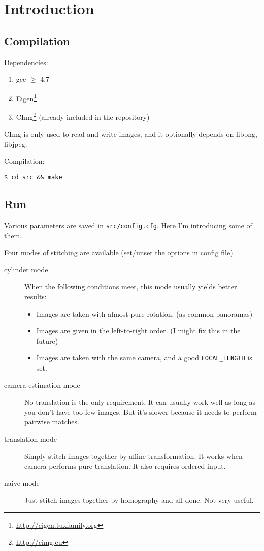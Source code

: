 \section{Introduction}
\subsection{Compilation}
Dependencies:

\begin{enumerate}
    \item gcc $ \ge$ 4.7
    \item Eigen\footnote{\url{http://eigen.tuxfamily.org}}
    \item CImg\footnote{\url{http://cimg.eu}} (already included in the repository)
    \end{enumerate}
    CImg is only used to read and write images, and it optionally depends
    on libpng, libjpeg.

Compilation:
\begin{lstlisting}
$ cd src && make
\end{lstlisting}

\subsection{Run}
Various parameters are saved in \verb|src/config.cfg|.
Here I'm introducing some of them.

Four modes of stitching are available (set/unset the options in config file)
\begin{description}
  \item[cylinder mode] When the following conditions meet, this mode usually yields better results:
\begin{itemize}
  \item Images are taken with almost-pure rotation. (as common panoramas)
  \item Images are given in the left-to-right order. (I might fix this in the future)
  \item Images are taken with the same camera, and a good \verb|FOCAL_LENGTH| is set.
\end{itemize}

\item[camera estimation mode] No translation is the only requirement.
  It can usually work well as long as you don't have too few images.
  But it's slower because it needs to perform pairwise matches.

\item[translation mode] Simply stitch images together by affine transformation.
  It works when camera performs pure translation.  It also requires ordered input.

\item[naive mode] Just stitch images together by homography and all done. Not very useful.
\end{description}

